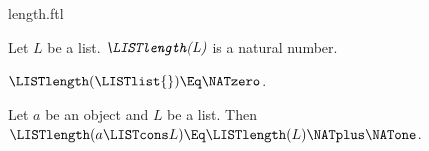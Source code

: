 \documentclass{stex}
\begin{document}
\begin{smodule}{length.ftl}

\begin{signature}[forthel,for=LISTlength]
  Let $L$ be a list.
  $\emph{\LISTlength(L)}$ is a natural number.
\end{signature}

\begin{axiom}[forthel,for=LISTlength]
  $\LISTlength(\LISTlist{}) \Eq \NATzero$.
\end{axiom}

\begin{axiom}[forthel,for=LISTlength]
  Let $a$ be an object and $L$ be a list.
  Then $\LISTlength(a \LISTcons L) \Eq \LISTlength(L) \NATplus \NATone$.
\end{axiom}
\end{smodule}
\end{document}
